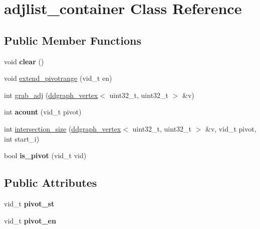 \hypertarget{classadjlist__container}{\section{adjlist\-\_\-container Class Reference}
\label{classadjlist__container}
}
\subsection*{Public Member Functions}
\begin{DoxyCompactItemize}
\item 
\hypertarget{classadjlist__container_a236081fd44719d380ad8b48116366745}{void {\bfseries clear} ()}\label{classadjlist__container_a236081fd44719d380ad8b48116366745}

\item 
void \hyperlink{classadjlist__container_ac43be3ce9e2e0f19cc1d52e13f766e28}{extend\-\_\-pivotrange} (vid\-\_\-t en)
\item 
int \hyperlink{classadjlist__container_a01e1226beec003fdff368951031804f9}{grab\-\_\-adj} (\hyperlink{classddgraph_1_1ddgraph__vertex}{ddgraph\-\_\-vertex}$<$ uint32\-\_\-t, uint32\-\_\-t $>$ \&v)
\item 
\hypertarget{classadjlist__container_a2cd6ffb88256e51ca1a6b52b6e344a05}{int {\bfseries acount} (vid\-\_\-t pivot)}\label{classadjlist__container_a2cd6ffb88256e51ca1a6b52b6e344a05}

\item 
int \hyperlink{classadjlist__container_aa9956e2b1bdbd885ec58037d84febef6}{intersection\-\_\-size} (\hyperlink{classddgraph_1_1ddgraph__vertex}{ddgraph\-\_\-vertex}$<$ uint32\-\_\-t, uint32\-\_\-t $>$ \&v, vid\-\_\-t pivot, int start\-\_\-i)
\item 
\hypertarget{classadjlist__container_aee04887c7a6764ad18b38ff29712df6f}{bool {\bfseries is\-\_\-pivot} (vid\-\_\-t vid)}\label{classadjlist__container_aee04887c7a6764ad18b38ff29712df6f}

\end{DoxyCompactItemize}
\subsection*{Public Attributes}
\begin{DoxyCompactItemize}
\item 
\hypertarget{classadjlist__container_a1aa05230b7526183677420251be8daf1}{vid\-\_\-t {\bfseries pivot\-\_\-st}}\label{classadjlist__container_a1aa05230b7526183677420251be8daf1}

\item 
\hypertarget{classadjlist__container_aa0c56c40c2bb02337cfce73d7ca1b45e}{vid\-\_\-t {\bfseries pivot\-\_\-en}}\label{classadjlist__container_aa0c56c40c2bb02337cfce73d7ca1b45e}

\end{DoxyCompactItemize}


